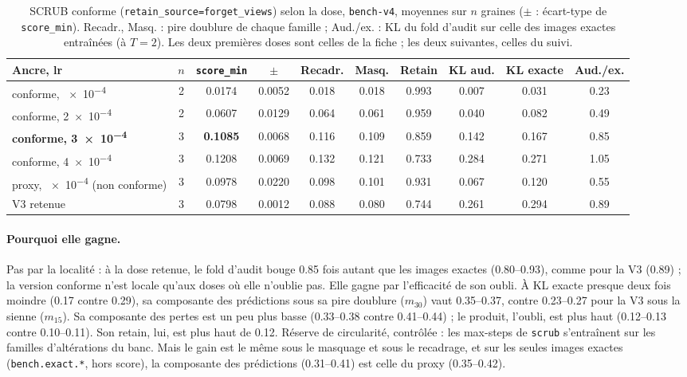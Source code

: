 \documentclass[11pt,a4paper]{article}
\newcommand{\code}[1]{\texttt{#1}}
\begin{document}
\begin{table}[ht]
  \centering\small
  \caption{SCRUB conforme (\code{retain\_source=forget\_views}) selon la dose, \code{bench-v4}, moyennes
  sur $n$ graines ($\pm$ : écart-type de \code{score\_min}). Recadr., Masq. : pire doublure de chaque
  famille ; Aud./ex. : KL du fold d'audit sur celle des images exactes entraînées (à $T=2$). Les deux
  premières doses sont celles de la fiche ; les deux suivantes, celles du suivi.}\label{tab:v4scrub}
  \setlength{\tabcolsep}{3pt}
  \begin{tabular}{@{}l c S[table-format=1.4] S[table-format=1.4] S S S S S S[table-format=1.2]@{}}
    \toprule
    Ancre, lr & $n$ & {\code{score\_min}} & {$\pm$} & {Recadr.} & {Masq.} & {Retain} & {KL aud.}
      & {KL exacte} & {Aud./ex.}\\
    \midrule
    conforme, \num{e-4} & 2 & 0.0174 & 0.0052 & 0.018 & 0.018 & 0.993 & 0.007 & 0.031 & 0.23\\
    conforme, \num{2e-4} & 2 & 0.0607 & 0.0129 & 0.064 & 0.061 & 0.959 & 0.040 & 0.082 & 0.49\\
    \textbf{conforme, \num{3e-4}} & 3 & \bfseries 0.1085 & 0.0068 & 0.116 & 0.109 & 0.859 & 0.142
      & 0.167 & 0.85\\
    conforme, \num{4e-4} & 3 & 0.1208 & 0.0069 & 0.132 & 0.121 & 0.733 & 0.284 & 0.271 & 1.05\\
    \midrule
    proxy, \num{e-4} (non conforme) & 3 & 0.0978 & 0.0220 & 0.098 & 0.101 & 0.931 & 0.067 & 0.120 & 0.55\\
    V3 retenue & 3 & 0.0798 & 0.0012 & 0.088 & 0.080 & 0.744 & 0.261 & 0.294 & 0.89\\
    \bottomrule
  \end{tabular}
\end{table}

\paragraph{Pourquoi elle gagne.} Pas par la localité : à la dose retenue, le fold d'audit bouge
\num{0.85} fois autant que les images exactes (\numrange{0.80}{0.93}), comme pour la V3
(\num{0.89}) ; la version conforme n'est locale qu'aux doses où elle n'oublie pas. Elle gagne par
l'efficacité de son oubli. À KL exacte presque deux fois moindre (\num{0.17} contre \num{0.29}), sa
composante des prédictions sous sa pire doublure ($m_{30}$) vaut \numrange{0.35}{0.37}, contre
\numrange{0.23}{0.27} pour la V3 sous la sienne ($m_{15}$). Sa composante des pertes est un peu plus
basse (\numrange{0.33}{0.38} contre \numrange{0.41}{0.44}) ; le produit, l'oubli, est plus haut
(\numrange{0.12}{0.13} contre \numrange{0.10}{0.11}). Son retain, lui, est plus haut de \num{0.12}.
Réserve de circularité, contrôlée : les max-steps de \code{scrub} s'entraînent sur les familles
d'altérations du banc. Mais le gain est le même sous le masquage et sous le recadrage, et sur les
seules images exactes (\code{bench.exact.*}, hors score), la composante des prédictions
(\numrange{0.31}{0.41}) est celle du proxy (\numrange{0.35}{0.42}).
\end{document}
